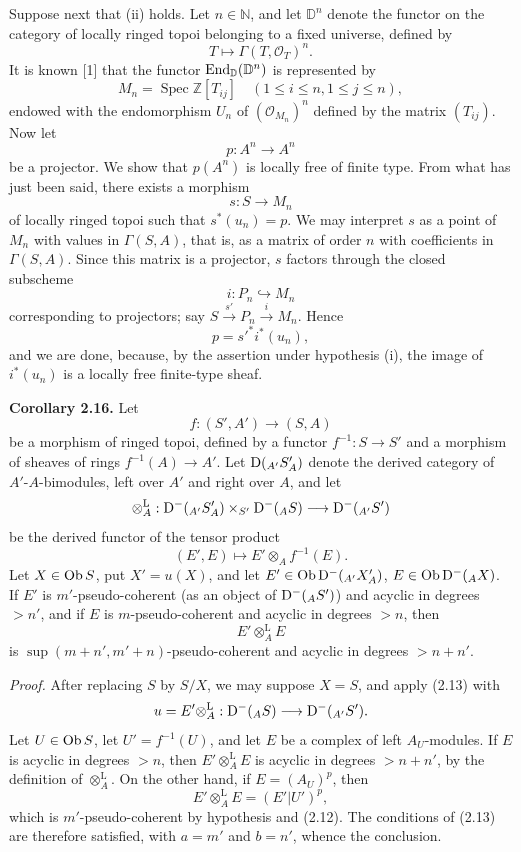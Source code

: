 \documentclass[11pt]{article}
\newcommand{\Spec}{\operatorname{Spec}}
\begin{document}
Suppose next that (ii) holds. Let \(n\in\mathbb N\), and let \(\mathbb D^n\) denote the functor on the category of locally ringed topoi belonging to a fixed universe, defined by
\[
  T\longmapsto \Gamma(T,\mathcal O_T)^n.
\]
It is known [1] that the functor \(\operatorname{End}_{\mathbb D}(\mathbb D^n)\) is represented by
\[
  M_n=\Spec\mathbb Z[T_{ij}]\quad(1\leq i\leq n,
  1\leq j\leq n),
\]
endowed with the endomorphism \(U_n\) of \((\mathcal O_{M_n})^n\) defined by the matrix \((T_{ij})\). Now let
\[
  p:A^n\longrightarrow A^n
\]
be a projector. We show that \(p(A^n)\) is locally free of finite type. From what has just been said, there exists a morphism
\[
  s:S\longrightarrow M_n
\]
of locally ringed topoi such that \(s^*(u_n)=p\). We may interpret \(s\) as a point of \(M_n\) with values in \(\Gamma(S,A)\), that is, as a matrix of order \(n\) with coefficients in \(\Gamma(S,A)\). Since this matrix is a projector, \(s\) factors through the closed subscheme
\[
  i:P_n\hookrightarrow M_n
\]
corresponding to projectors; say \(S\xrightarrow{s'}P_n\xrightarrow{i}M_n\). Hence
\[
  p=s'^* i^*(u_n),
\]
and we are done, because, by the assertion under hypothesis (i), the image of \(i^*(u_n)\) is a locally free finite-type sheaf.

\textbf{Corollary 2.16.} Let
\[
  f:(S',A')\longrightarrow (S,A)
\]
be a morphism of ringed topoi, defined by a functor \(f^{-1}:S\to S'\) and a morphism of sheaves of rings \(f^{-1}(A)\to A'\). Let \(\mathrm D(_{A'}S'_A)\) denote the derived category of \(A'\)-\(A\)-bimodules, left over \(A'\) and right over \(A\), and let
\[
  \otimes_A^{\mathrm L}:\mathrm D^-(_{A'}S'_A)\times_{S'}\mathrm D^-(_A S)
  \longrightarrow \mathrm D^-(_{A'}S')
\]
be the derived functor of the tensor product
\[
  (E',E)\longmapsto E'\otimes_A f^{-1}(E).
\]
Let \(X\in\operatorname{Ob} S\), put \(X'=u(X)\), and let \(E'\in\operatorname{Ob}\mathrm D^-(_{A'}X'_A)\), \(E\in\operatorname{Ob}\mathrm D^-(_A X)\). If \(E'\) is \(m'\)-pseudo-coherent (as an object of \(\mathrm D^-(_A S')\)) and acyclic in degrees \(>n'\), and if \(E\) is \(m\)-pseudo-coherent and acyclic in degrees \(>n\), then
\[
  E'\otimes_A^{\mathrm L}E
\]
is \(\sup(m+n',m'+n)\)-pseudo-coherent and acyclic in degrees \(>n+n'\).

\emph{Proof.} After replacing \(S\) by \(S/X\), we may suppose \(X=S\), and apply (2.13) with
\[
  u=E'\otimes_A^{\mathrm L}:\mathrm D^-(_A S)\longrightarrow \mathrm D^-(_{A'}S').
\]
Let \(U\in\operatorname{Ob} S\), let \(U'=f^{-1}(U)\), and let \(E\) be a complex of left \(A_U\)-modules. If \(E\) is acyclic in degrees \(>n\), then \(E'\otimes_A^{\mathrm L}E\) is acyclic in degrees \(>n+n'\), by the definition of \(\otimes_A^{\mathrm L}\). On the other hand, if \(E=(A_U)^p\), then
\[
  E'\otimes_A^{\mathrm L}E=(E'|U')^p,
\]
which is \(m'\)-pseudo-coherent by hypothesis and (2.12). The conditions of (2.13) are therefore satisfied, with \(a=m'\) and \(b=n'\), whence the conclusion.
\end{document}
